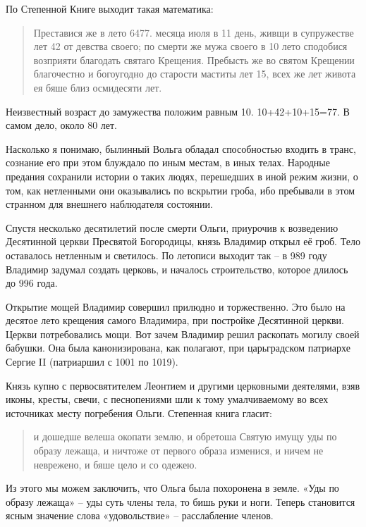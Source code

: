 По Степенной Книге выходит такая математика:

\begin{quotation}
Преставися же в лето 6477. месяца июля в 11 день, живщи в супружестве лет 42 от девства своего; по смерти же мужа своего в 10 лето сподобися возприяти благодать святаго Крещения. Пребысть же во святом Крещении благочестно и богоугодно до старости маститы лет 15, всех же лет живота ея бяше близ осмидесяти лет.
\end{quotation}

Неизвестный возраст до замужества положим равным 10. 10+42+10+15=77. В самом дело, около 80 лет.

Насколько я понимаю, былинный Вольга обладал способностью входить в транс, сознание его при этом блуждало по иным местам, в иных телах. Народные предания сохранили истории о таких людях, перешедших в иной режим жизни, о том, как нетленными они оказывались по вскрытии гроба, ибо пребывали в этом странном для внешнего наблюдателя состоянии.

Спустя несколько десятилетий после смерти Ольги, приурочив к возведению Десятинной церкви Пресвятой Богородицы, князь Владимир открыл её гроб. Тело оставалось нетленным и светилось. По летописи выходит так – в 989 году Владимир задумал создать церковь, и началось строительство, которое длилось до 996 года.

Открытие мощей Владимир совершил прилюдно и торжественно. Это было на десятое лето крещения самого Владимира, при постройке Десятинной церкви. Церкви потребовались мощи. Вот зачем Владимир решил раскопать могилу своей бабушки. Она была канонизирована, как полагают, при царьградском патриархе Сергие II (патриаршил с 1001 по 1019).

Князь купно с первосвятителем Леонтием и другими церковными деятелями, взяв иконы, кресты, свечи, с песнопениями шли к тому умалчиваемому во всех источниках месту погребения Ольги. Степенная книга гласит:

\begin{quotation}
и дошедше велеша окопати землю, и обретоша Святую имущу уды по образу лежаща, и ничтоже от первого образа изменися, и ничем не неврежено, и бяше цело и со одежею.
\end{quotation}

Из этого мы можем заключить, что Ольга была похоронена в земле. «Уды по образу лежаща» – уды суть члены тела, то бишь руки и ноги. Теперь становится ясным значение слова «удовольствие» – расслабление членов.


